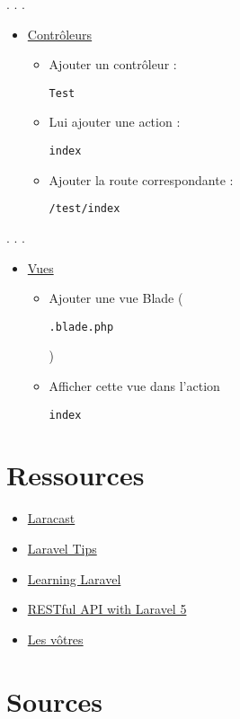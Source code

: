 . . .

\begin{itemize}
\tightlist
\item
  \href{https://laravel.com/docs/master/controllers}{Contrôleurs}

  \begin{itemize}
  \tightlist
  \item
    Ajouter un contrôleur :
    \begin{otherlanguage}{english}\texttt{Test}\end{otherlanguage}
  \item
    Lui ajouter une action :
    \begin{otherlanguage}{english}\texttt{index}\end{otherlanguage}
  \item
    Ajouter la route correspondante :
    \begin{otherlanguage}{english}\texttt{/test/index}\end{otherlanguage}
  \end{itemize}
\end{itemize}

. . .

\begin{itemize}
\tightlist
\item
  \href{https://laravel.com/docs/master/views}{Vues}

  \begin{itemize}
  \tightlist
  \item
    Ajouter une vue Blade
    (\begin{otherlanguage}{english}\texttt{.blade.php}\end{otherlanguage})
  \item
    Afficher cette vue dans l'action
    \begin{otherlanguage}{english}\texttt{index}\end{otherlanguage}
  \end{itemize}
\end{itemize}

\hypertarget{ressources}{%
\section{Ressources}\label{ressources}}

\begin{itemize}
\tightlist
\item
  \href{https://laracasts.com/series/laravel-5-fundamentals}{Laracast}
\item
  \href{https://laraveltips.wordpress.com/}{Laravel Tips}
\item
  \href{http://learninglaravel.net/tags/tutorials}{Learning Laravel}
\item
  \href{http://www.tutorials.kode-blog.com/laravel-5-rest-api}{RESTful
  API with Laravel 5}
\item
  \href{https://projets-labinfo.he-arc.ch/projects/webdev/wiki/Ressources_devweb}{Les
  vôtres}
\end{itemize}

\begin{otherlanguage}{english}

\end{otherlanguage}

\hypertarget{sources}{%
\section{Sources}\label{sources}}
